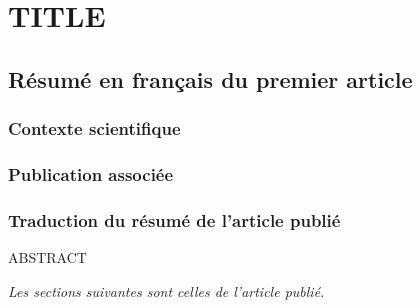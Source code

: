 \chapter{TITLE}
\label{chap1}

\section{Résumé en français du premier article}

\subsection{Contexte scientifique}

\subsection{Publication associée}

\subsection{Traduction du résumé de l'article publié}

ABSTRACT

\textit{Les sections suivantes sont celles de l’article publié.}
